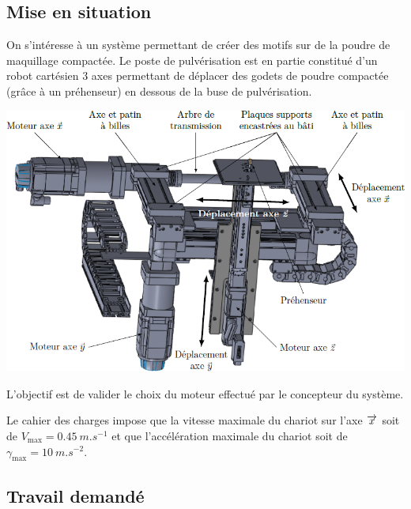 \documentclass[10pt,fleqn]{article} %
\begin{document}

\vspace{4.5cm}
\pagestyle{fancy}
\thispagestyle{plain}


\def\columnseprulecolor{\color{ocre}}
\setlength{\columnseprule}{0.4pt} 

\begin{multicols}{2}
\section*{Mise en situation}
\ifprof
\else
On s'intéresse à un système permettant de créer des motifs sur de la poudre de maquillage compactée. Le poste de pulvérisation est en partie constitué d'un robot cartésien 3 axes permettant de déplacer des godets de poudre compactée (grâce à un préhenseur) en dessous de la buse de pulvérisation. 

\begin{center}
\includegraphics[width=\linewidth]{images/fig_02}
\end{center}

\fi

\begin{obj}
L’objectif est de valider le choix du moteur effectué par le concepteur du système.

Le cahier des charges impose que la vitesse maximale du chariot sur l’axe $\overrightarrow{x}$ soit de $V_{\text{max}}= \SI{0,45}{m.s^{-1}}$ et que l’accélération maximale du chariot soit de $\gamma_{\text{max}}= \SI{10}{m.s^{-2}}$.
\end{obj}

\subsection*{Travail demandé}


\end{multicols}
\end{document}
